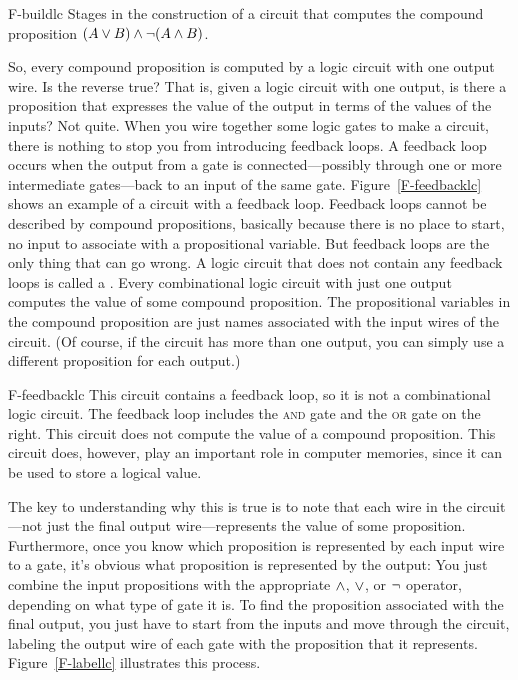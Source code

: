 \fig
   {F-buildlc}
   {Stages in the construction of a circuit that computes
    the compound proposition $(A\vee B)\wedge\lnot(A\wedge B)$.}
   {}
   
\medbreak
   
So, every compound proposition is computed by a logic circuit
with one output wire.  Is the reverse true?  That is, given
a logic circuit with one output, is there a proposition that
expresses the value of the output in terms of the values of
the inputs?  Not quite.  When you wire together some logic
gates to make a circuit, there is nothing to stop you from
introducing feedback loops.  A feedback loop occurs when
the output from a gate is connected---possibly through one
or more intermediate gates---back to an input of the same gate.
Figure~\ref{F-feedbacklc} shows an example of a circuit with
a feedback loop.
Feedback loops cannot be described by compound propositions,
basically because there is no place to start, no input to
associate with a propositional variable.  But feedback
loops are the only thing that can go wrong.  A logic circuit
that does not contain any feedback loops is called a
.  Every combinational
logic circuit with just one output computes the value of
some compound proposition.  The propositional variables in
the compound proposition are just names associated with
the input wires of the circuit.  (Of course, if the circuit has
more than one output, you can simply use a different proposition
for each output.)  

\fig
   {F-feedbacklc}
   {This circuit contains a feedback loop, so it is not a
    combinational logic circuit.  The feedback loop includes
    the \textsc{and} gate and the \textsc{or} gate on the right.
    This circuit does not compute the value of a compound proposition.
    This circuit does, however, play an important role in computer
    memories, since it can be used to store a logical value.}
   {}

The key to understanding why this is true
is to note that each wire in the circuit---not just the final
output wire---represents the value of some proposition.  
Furthermore, once you know which proposition is represented by
each input wire to a gate, it's obvious what proposition is
represented by the output: You just combine the input propositions
with the appropriate $\wedge$, $\vee$, or $\lnot$ operator, depending
on what type of gate it is.   To find
the proposition associated with the final output, you just have to
start from the inputs and move through the circuit, labeling the
output wire of each gate with the proposition that it represents.
Figure~\ref{F-labellc} illustrates this process.

